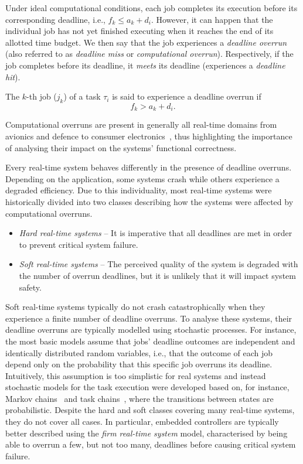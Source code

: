 Under ideal computational conditions, each job completes its execution before its corresponding deadline, i.e., $f_k \leq a_k + d_i$.
However, it can happen that the individual job has not yet finished executing when it reaches the end of its allotted time budget.
We then say that the job experiences a \emph{deadline overrun} (also referred to as \emph{deadline miss} or \emph{computational overrun}).
Respectively, if the job completes before its deadline, it \emph{meets} its deadline (experiences a \emph{deadline hit}).
%
\begin{definition}%
    \label{def:kappa:overrun}%
    The $k$-th job ($j_k$) of a task $\tau_i$ is said to experience a deadline overrun if
    \begin{equation*}
        f_k > a_k + d_i.
    \end{equation*}
\end{definition}
%
Computational overruns are present in generally all real-time domains from avionics and defence to consumer electronics~\cite{Akesson:2020}, thus highlighting the importance of analysing their impact on the systems' functional correctness.

Every real-time system behaves differently in the presence of deadline overruns.
Depending on the application, some systems crash while others experience a degraded efficiency.
Due to this individuality, most real-time systems were historically divided into two classes describing how the systems were affected by computational overruns.
%
\begin{itemize}
    \item \emph{Hard real-time systems} -- It is imperative that all deadlines are met in order to prevent critical system failure.

    \item \emph{Soft real-time systems} -- The perceived quality of the system is degraded with the number of overrun deadlines, but it is unlikely that it will impact system safety.
\end{itemize}
%
Soft real-time systems typically do not crash catastrophically when they experience a finite number of deadline overruns.
To analyse these systems, their deadline overruns are typically modelled using stochastic processes.
For instance, the most basic models assume that jobs' deadline outcomes are independent and identically distributed random variables, i.e., that the outcome of each job depend only on the probability that this specific job overruns its deadline.
Intuitively, this assumption is too simplistic for real systems and instead stochastic models for the task execution were developed based on, for instance, Markov chains~\cite{Liu:2005, Friebe:2022, Abeni:2017, Lincoln:2002} and task chains~\cite{Manolache:2004, Liu:2010}, where the transitions between states are probabilistic.
Despite the hard and soft classes covering many real-time systems, they do not cover all cases.
In particular, embedded controllers are typically better described using the \emph{firm real-time system} model, characterised by being able to overrun a few, but not too many, deadlines before causing critical system failure.

